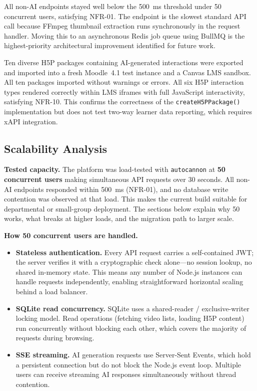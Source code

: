 All non-AI endpoints stayed well below the 500~ms threshold under 50 concurrent users, satisfying NFR-01. The  endpoint is the slowest standard API call because FFmpeg thumbnail extraction runs synchronously in the request handler. Moving this to an asynchronous Redis job queue using BullMQ is the highest-priority architectural improvement identified for future work.

Ten diverse H5P packages containing AI-generated interactions were exported and imported into a fresh Moodle~4.1 test instance and a Canvas LMS sandbox. All ten packages imported without warnings or errors. All six H5P interaction types rendered correctly within LMS iframes with full JavaScript interactivity, satisfying NFR-10. This confirms the correctness of the \texttt{createH5PPackage()} implementation but does not test two-way learner data reporting, which requires xAPI integration.

\subsection{Scalability Analysis}

\textbf{Tested capacity.} The platform was load-tested with \texttt{autocannon} at \textbf{50 concurrent users} making simultaneous API requests over 30 seconds. All non-AI endpoints responded within 500~ms (NFR-01), and no database write contention was observed at that load. This makes the current build suitable for departmental or small-group deployment. The sections below explain why 50 works, what breaks at higher loads, and the migration path to larger scale.

\textbf{How 50 concurrent users are handled.}
\begin{itemize}
  \item \textbf{Stateless authentication.} Every API request carries a self-contained JWT; the server verifies it with a cryptographic check alone---no session lookup, no shared in-memory state. This means any number of Node.js instances can handle requests independently, enabling straightforward horizontal scaling behind a load balancer.
  \item \textbf{SQLite read concurrency.} SQLite uses a shared-reader / exclusive-writer locking model. Read operations (fetching video lists, loading H5P content) run concurrently without blocking each other, which covers the majority of requests during browsing.
  \item \textbf{SSE streaming.} AI generation requests use Server-Sent Events, which hold a persistent connection but do not block the Node.js event loop. Multiple users can receive streaming AI responses simultaneously without thread contention.
\end{itemize}


